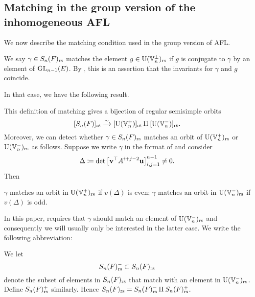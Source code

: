 \subsection{Matching in the group version of the inhomogeneous AFL}
We now describe the matching condition used in the group version of AFL.
\begin{definition}
  We say $\gamma \in S_n(F)_{\mathrm{rs}}$ matches the element $g \in \operatorname{U}(\mathbb V_n^\pm)_{\mathrm{rs}}$
  if $g$ is conjugate to $\gamma$ by an element of $\operatorname{GL}_{n-1}(E)$.
  By , this is an assertion that
  the invariants for $\gamma$ and $g$ coincide.
  \label{def:matching_inhomog}
\end{definition}
In that case, we have the following result.
\begin{proposition}
  \label{prop:valuation_delta_matching_group}
  This definition of matching gives
  a bijection of regular semisimple orbits
  \[ [S_n(F)]_{\mathrm{rs}} \xrightarrow{\sim} [\operatorname{U}(\mathbb V_n^+)]_{\mathrm{rs}} \amalg [\operatorname{U}(\mathbb V_n^-)]_{\mathrm{rs}}. \]
  Moreover, we can detect whether $\gamma \in S_n(F)_{\mathrm{rs}}$ matches an orbit of
  $\operatorname{U}(\mathbb V_n^+)_{\mathrm{rs}}$ or $\operatorname{U}(\mathbb V_n^-)_{\mathrm{rs}}$ as follows.
  Suppose we write $\gamma$ in the format of  and consider
  \[ \Delta \coloneqq \det \left[ \mathbf v^\top A^{i+j-2} \mathbf u \right]_{i,j=1}^{n-1} \neq 0. \]
  Then
  \begin{itemize}
    \ii $\gamma$ matches an orbit in $\operatorname{U}(\mathbb V_n^+)_{\mathrm{rs}}$ if $v(\Delta)$ is even;
    \ii $\gamma$ matches an orbit in $\operatorname{U}(\mathbb V_n^-)_{\mathrm{rs}}$ if $v(\Delta)$ is odd.
  \end{itemize}
\end{proposition}
In this paper, 
requires that $\gamma$ should match an element of $\operatorname{U}(\mathbb V_n^-)_{\mathrm{rs}}$
and consequently we will usually only be interested in the latter case.
We write the following abbreviation:
\begin{definition}
  [$S_n(F)\rs^\pm$]
  We let \[ S_n(F)_{\mathrm{rs}}^- \subset S_n(F)_{\mathrm{rs}} \]
  denote the subset of elements in $S_n(F)_{\mathrm{rs}}$ that match
  with an element in $\operatorname{U}(\mathbb V_n^-)_{\mathrm{rs}}$.
  Define $S_n(F)_{\mathrm{rs}}^+$ similarly.
  Hence $S_n(F)_{\mathrm{rs}} = S_n(F)_{\mathrm{rs}}^- \amalg S_n(F)_{\mathrm{rs}}^+$.
\end{definition}

